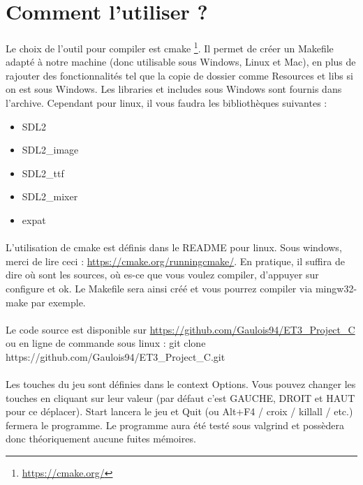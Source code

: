 \section{Comment l'utiliser ?}

\paragraph{} Le choix de l'outil pour compiler est cmake \footnote{\url{https://cmake.org/}}. Il permet de créer un Makefile adapté à notre machine (donc utilisable sous Windows, Linux et Mac), en plus de rajouter des fonctionnalités tel que la copie de dossier comme Resources et libs si on est sous Windows. Les libraries et includes sous Windows sont fournis dans l'archive. Cependant pour linux, il vous faudra les bibliothèques suivantes :

\begin{itemize}
	\item SDL2
	\item SDL2\_image
	\item SDL2\_ttf
	\item SDL2\_mixer
	\item expat
\end{itemize}

\paragraph{} L'utilisation de cmake est définis dans le README pour linux. Sous windows, merci de lire ceci : \url{https://cmake.org/runningcmake/}. En pratique, il suffira de dire où sont les sources, où es-ce que vous voulez compiler, d'appuyer sur configure et ok. Le Makefile sera ainsi créé et vous pourrez compiler via mingw32-make par exemple.
\paragraph{} Le code source est disponible sur \url{https://github.com/Gaulois94/ET3\_Project\_C} ou en ligne de commande sous linux : git clone https://github.com/Gaulois94/ET3\_Project\_C.git
\paragraph{} Les touches du jeu sont définies dans le context Options. Vous pouvez changer les touches en cliquant sur leur valeur (par défaut c'est GAUCHE, DROIT et HAUT pour ce déplacer). Start lancera le jeu et Quit (ou Alt+F4 / croix / killall / etc.) fermera le programme. Le programme aura été testé sous valgrind et possèdera donc théoriquement aucune fuites mémoires.
